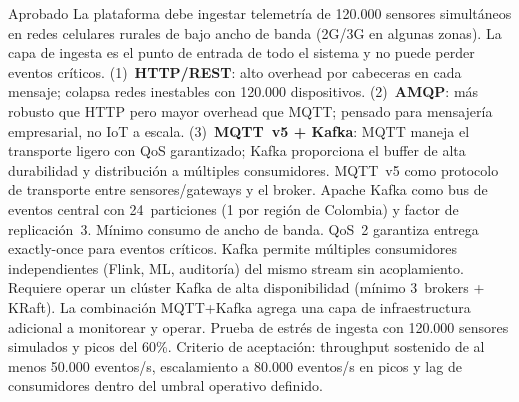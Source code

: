 \documentclass[12pt, letterpaper]{article}
\begin{document}
  {Aprobado}
  {La plataforma debe ingestar telemetría de 120.000 sensores simultáneos en redes
   celulares rurales de bajo ancho de banda (2G/3G en algunas zonas). La capa de
   ingesta es el punto de entrada de todo el sistema y no puede perder eventos
   críticos.}
  {(1)~\textbf{HTTP/REST}: alto overhead por cabeceras en cada mensaje; colapsa redes
   inestables con 120.000 dispositivos.
   (2)~\textbf{AMQP}: más robusto que HTTP pero mayor overhead que MQTT; pensado para
   mensajería empresarial, no IoT a escala.
   (3)~\textbf{MQTT~v5 + Kafka}: MQTT maneja el transporte ligero con QoS garantizado;
   Kafka proporciona el buffer de alta durabilidad y distribución a múltiples
   consumidores.}
  {MQTT~v5 como protocolo de transporte entre sensores/gateways y el broker. Apache
   Kafka como bus de eventos central con 24~particiones (1 por región de Colombia) y
   factor de replicación~3.}
  {Mínimo consumo de ancho de banda. QoS~2 garantiza entrega exactly-once para eventos
   críticos. Kafka permite múltiples consumidores independientes (Flink, ML, auditoría)
   del mismo stream sin acoplamiento.}
  {Requiere operar un clúster Kafka de alta disponibilidad (mínimo 3~brokers + KRaft).
    La combinación MQTT+Kafka agrega una capa de infraestructura adicional a monitorear
    y operar.}
    {Prueba de estrés de ingesta con 120.000 sensores simulados y picos del 60\%.
    Criterio de aceptación: throughput sostenido de al menos 50.000 eventos/s,
    escalamiento a 80.000 eventos/s en picos y lag de consumidores dentro del umbral
    operativo definido.}
\end{document}
